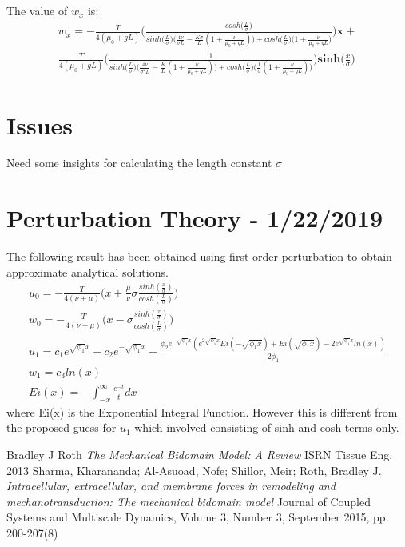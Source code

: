 \documentclass[a4paper,oneside,11pt]{report}
\begin{document}
The value of $w_x$ is: 
\begin{align*}
w_x = -\frac{T}{4(\mu_0 + gL)} \Bigg ( \frac{cosh\Big ( \frac{L}{\sigma} \Big )}{sinh \Big( \frac{L}{\sigma}\Big ) \Big ( \frac{4\nu}{\sigma L} - \frac{K \sigma}{L} (1+ \frac{\nu}{\mu_0 + gL}) \Big ) + cosh\Big ( \frac{L}{\sigma} \Big ) \Big ( 1+ \frac{\nu}{\mu_0 + gL} \Big )} \Bigg)\textbf{x} + \\
\frac{T}{4(\mu_0 + gL)} \Bigg ( \frac{1}{sinh \Big( \frac{L}{\sigma}\Big ) \Big ( \frac{4\nu}{\sigma^2 L} - \frac{K}{L} (1+ \frac{\nu}{\mu_0 + gL}) \Big ) + cosh\Big ( \frac{L}{\sigma} \Big ) \Big (  \frac{1}{\sigma} (1+ \frac{\nu}{\mu_0 + gL}) \Big )} \Bigg)\textbf{sinh} \Big ( \frac{x}{\sigma} \Big )
\end{align*}
\section*{Issues}
Need some insights for calculating the length constant $\sigma$
\newpage
\section*{Perturbation Theory - 1/22/2019}
The following result has been obtained using first order perturbation to obtain approximate analytical solutions.\\
\begin{align*}
u_0 = -\frac{T}{4(\nu + \mu)} \Big ( x + \frac{\mu}{\nu} \sigma \frac{sinh(\frac{x}{\sigma})}{cosh(\frac{L}{\sigma})}\Big )\\
w_0 = -\frac{T}{4(\nu + \mu)} \Big ( x - \sigma \frac{sinh(\frac{x}{\sigma})}{cosh(\frac{L}{\sigma})}\Big )\\
u_1 = c_1 e^{\sqrt{\phi_1}x} + c_2 e^{-\sqrt{\phi_1}x} - \frac{\phi_2 e^{-\sqrt{\phi_1}x}(e^{2\sqrt{\phi_1}x}Ei(-\sqrt{\phi_1 x}) + Ei(\sqrt{\phi_1 x}) - 2e^{\sqrt{\phi_1}x} ln(x))}{2\phi_1}\\
w_1 = c_3 ln(x)\\
Ei(x) = -\int_{-x}^{\infty} \frac{e^{-t}}{t} dx
\end{align*}
where Ei(x) is the Exponential Integral Function. 
However this is different from the proposed guess for  $u_1$ which involved  consisting of sinh and cosh terms only. 
\begin{thebibliography}{9}
	Bradley J Roth
	\textit{The Mechanical Bidomain Model: A Review}
	ISRN Tissue Eng. 2013
	 Sharma, Kharananda; Al-Asuoad, Nofe; Shillor, Meir; Roth, Bradley J.
	\textit{Intracellular, extracellular, and membrane forces in remodeling and mechanotransduction: The mechanical bidomain model}
	Journal of Coupled Systems and Multiscale Dynamics, Volume 3, Number 3, September 2015, pp. 200-207(8)
\end{thebibliography}
\end{document}
